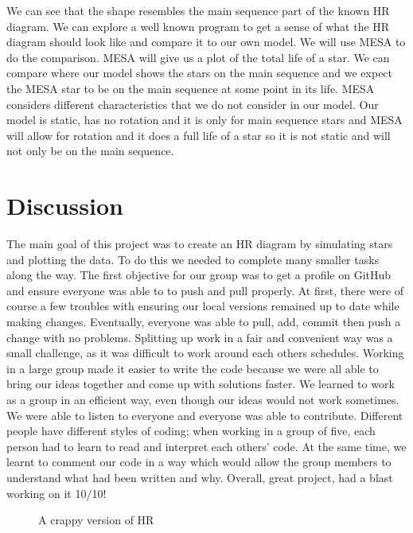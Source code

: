 \documentclass[10pt]{article}
\begin{document}
We can see that the shape resembles the main sequence part of the known HR diagram. We can explore a well known program to get a sense of what the HR diagram should look like and compare it to our own model. We will use MESA to do the comparison. MESA will give us a plot of the total life of a star. We can compare where our model shows the stars on the main sequence and we expect the MESA star to be on the main sequence at some point in its life. MESA considers different characteristics that  we do not consider in our model. Our model is static, has no rotation and it is only for main sequence stars and MESA will allow for rotation and it does a full life of a star so it is not static and will not only be on the main sequence. \\ 

\section{Discussion}
The main goal of this project was to create an HR diagram by simulating stars and plotting the data. To do this we needed to complete many smaller tasks along the way. The first objective for our group was to get a profile on GitHub and ensure everyone was able to to push and pull properly. At first, there were of course a few troubles with  ensuring our local versions remained up to date while making changes. Eventually, everyone was able to pull, add, commit then push a change with no problems. Splitting up work in a fair and convenient way was a small challenge, as it was difficult to work around each others schedules. Working in a large group made it easier to write the code because we were all able to bring our ideas together and come up with solutions faster. We learned to work as a group in an efficient way, even though our ideas would not work sometimes. We were able to listen to everyone and everyone was able to contribute. Different people have different styles of coding; when working in a group of five, each person had to learn to read and interpret each others' code. At the same time, we learnt to comment our code in a way which would allow the group members to understand what had been written and why. Overall, great project, had a blast working on it 10/10!\\


\begin{figure}[p]
\begin{centering}

\caption{A crappy version of HR}
\label{fig:badHR}
\end{centering}
\end{figure}
\end{document}
